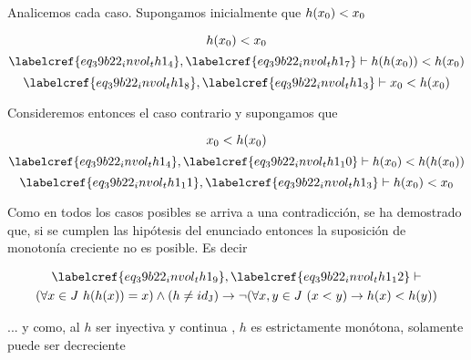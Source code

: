 Analicemos cada caso. Supongamos inicialmente que $h(x\textsubscript{0}) < x\textsubscript{0}$

\begin{equation} \label{eq_39b22_invol_th1_7}
	h(x\textsubscript{0}) < x\textsubscript{0}
\end{equation}
\begin{equation} \label{eq_39b22_invol_th1_8}
	\labelcref{eq_39b22_invol_th1_4}, \labelcref{eq_39b22_invol_th1_7} \vdash h(h(x\textsubscript{0})) < h(x\textsubscript{0})
\end{equation}
\begin{equation} \label{eq_39b22_invol_th1_9}
	\labelcref{eq_39b22_invol_th1_8}, \labelcref{eq_39b22_invol_th1_3} \vdash x\textsubscript{0} < h(x\textsubscript{0})
\end{equation}

Consideremos entonces el caso contrario y supongamos que 

\begin{equation} \label{eq_39b22_invol_th1_10}
	x\textsubscript{0} < h(x\textsubscript{0})
\end{equation}
\begin{equation} \label{eq_39b22_invol_th1_11}
	\labelcref{eq_39b22_invol_th1_4}, \labelcref{eq_39b22_invol_th1_10} \vdash h(x\textsubscript{0}) < h(h(x\textsubscript{0}))
\end{equation}
\begin{equation} \label{eq_39b22_invol_th1_12}
	\labelcref{eq_39b22_invol_th1_11}, \labelcref{eq_39b22_invol_th1_3} \vdash h(x\textsubscript{0}) < x\textsubscript{0}
\end{equation}

Como en todos los casos posibles se arriva a una contradicción, se ha demostrado que, si se cumplen las hipótesis del enunciado entonces la suposición de monotonía creciente no es posible. Es decir 

\begin{equation} \label{eq_39b22_invol_th1_13}
\begin{gathered}
	\labelcref{eq_39b22_invol_th1_9}, \labelcref{eq_39b22_invol_th1_12}\vdash \\
	(\forall x \in J\ h(h(x)) = x) \land (h \neq id\textsubscript{J}) \to \neg(\forall x,y \in J\ (x < y) \to h(x) < h(y))
\end{gathered}
\end{equation}

... y como, al $h$  ser inyectiva y continua , $h$ es estrictamente monótona, solamente puede ser decreciente


